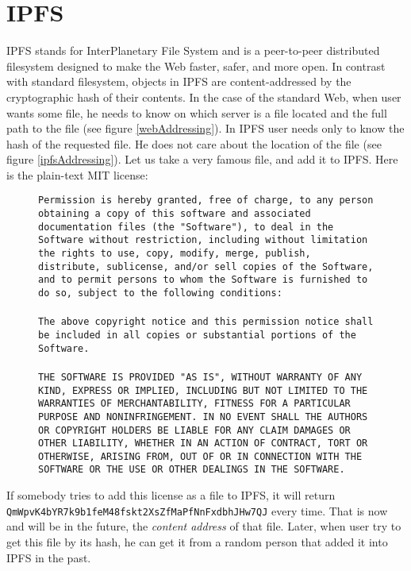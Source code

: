 \chapter{IPFS}
\label{ipfs}

IPFS stands for InterPlanetary File System and is a peer-to-peer distributed filesystem designed to make the Web faster, safer, and more open. In contrast with standard filesystem, objects in IPFS are content-addressed by the cryptographic hash of their contents. In the case of the standard Web, when user wants some file, he needs to know on which server is a file located and the full path to the file (see figure \ref{webAddressing}). In IPFS user needs only to know the hash of the requested file. He does not care about the location of the file (see figure \ref{ipfsAddressing}). Let us take a very famous file, and add it to IPFS. Here is the plain-text MIT license:

\begin{figure}[H]
    \texttt{Permission is hereby granted, free of charge, to any person obtaining a copy of this software and associated documentation files (the "Software"), to deal in the Software without restriction, including without limitation the rights to use, copy, modify, merge, publish, distribute, sublicense, and/or sell copies of the Software, and to permit persons to whom the Software is furnished to do so, subject to the following conditions:\\\\ The above copyright notice and this permission notice shall be included in all copies or substantial portions of the Software.\\\\ THE SOFTWARE IS PROVIDED "AS IS", WITHOUT WARRANTY OF ANY KIND, EXPRESS OR IMPLIED, INCLUDING BUT NOT LIMITED TO THE WARRANTIES OF MERCHANTABILITY, FITNESS FOR A PARTICULAR PURPOSE AND NONINFRINGEMENT. IN NO EVENT SHALL THE AUTHORS OR COPYRIGHT HOLDERS BE LIABLE FOR ANY CLAIM DAMAGES OR OTHER LIABILITY, WHETHER IN AN ACTION OF CONTRACT, TORT OR OTHERWISE, ARISING FROM, OUT OF OR IN CONNECTION WITH THE SOFTWARE OR THE USE OR OTHER DEALINGS IN THE SOFTWARE.}
\end{figure}

\noindent If somebody tries to add this license as a file to IPFS, it will return \texttt{QmWpvK4bYR7k9b1feM48fsk\-t2XsZfMaPfNnFxdbhJHw7QJ} every time. That is now and will be in the future, the \textit{content address} of that file. Later, when user try to get this file by its hash, he can get it from a random person that added it into IPFS in the past.


